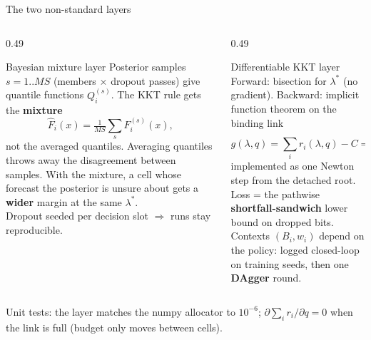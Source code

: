 \documentclass[aspectratio=169,11pt,xcolor=table]{beamer}
\begin{document}
\begin{frame}{The two non-standard layers}
  \footnotesize
  \begin{columns}[T]
    \begin{column}{0.49\textwidth}
      \begin{block}{Bayesian mixture layer}
        Posterior samples $s = 1..M S$ (members $\times$ dropout passes) give quantile functions $Q_i^{(s)}$. The KKT rule gets the \textbf{mixture}
        \[ \hat F_i(x) = \tfrac{1}{MS}\textstyle\sum_s F_i^{(s)}(x), \]
        not the averaged quantiles. Averaging quantiles throws away the disagreement between samples. With the mixture, a cell whose forecast the posterior is unsure about gets a \textbf{wider} margin at the same $\lambda^\ast$.\\[3pt]
        Dropout seeded per decision slot $\Rightarrow$ runs stay reproducible.
      \end{block}
    \end{column}
    \begin{column}{0.49\textwidth}
      \begin{block}{Differentiable KKT layer}
        Forward: bisection for $\lambda^\ast$ (no gradient). Backward: implicit function theorem on the binding link
        \[ g(\lambda,q) = \textstyle\sum_i r_i(\lambda,q) - C = 0 \;\Rightarrow\; \frac{\partial\lambda^\ast}{\partial q} = -\frac{\partial g/\partial q}{\partial g/\partial \lambda}, \]
        implemented as one Newton step from the detached root. Loss = the pathwise \textbf{shortfall-sandwich} lower bound on dropped bits.\\[3pt]
        Contexts $(B_i, w_i)$ depend on the policy: logged closed-loop on training seeds, then one \textbf{DAgger} round.
      \end{block}
    \end{column}
  \end{columns}
  \vspace{2pt}
  \centering\footnotesize Unit tests: the layer matches the numpy allocator to $10^{-6}$; $\partial\sum_i r_i/\partial q = 0$ when the link is full (budget only moves between cells).
\end{frame}
\end{document}
